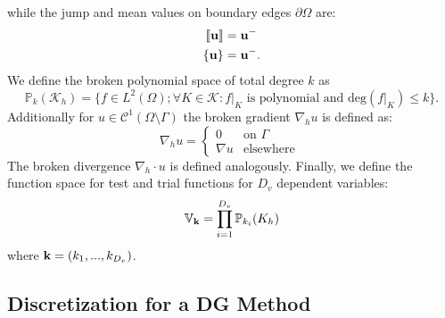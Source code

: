 while the jump and mean values on boundary edges $\partial \Omega$ are:
\begin{align}
	\llbracket \textbf{u} \rrbracket & = \textbf{u}^-  \\
	\{\textbf{u}\}                   & = \textbf{u}^-.
\end{align}
We define the broken polynomial space of total degree $k$ as
\begin{equation}
	\mathbb{P}_k(\mathcal{K}_h)= \{f \in L^2\left(\Omega\right); \forall K \in \mathcal{K}: f\vert_{K} \text{ is polynomial and deg}\left(f\vert_{K}\right)\leq k \}.
	\label{Eq:PolSpace}
\end{equation}
Additionally for $u \in \mathcal{C}^1(\Omega \setminus \Gamma)$ the broken gradient $\nabla_h u$ is defined as:
\begin{equation}
	\nabla_h u
	= \begin{cases}
		0
		 & \text{on }\Gamma  \\
		\nabla u
		 & \text{elsewhere }
	\end{cases}
\end{equation}
The broken divergence  $\nabla_h \cdot u$ is defined analogously. Finally, we define the function space for test and trial functions for $D_v$ dependent variables:
\begin{equation}
	\mathbb{V}_{\textbf{k}} = \prod_{i=1}^{D_v} \mathbb{P}_{k_i}(K_h)
	\label{Eq:Vspace}
\end{equation}
where $\textbf{k} = \left(k_1,...,k_{D_v}\right)$.



\subsection{Discretization for a DG Method}
\label{sec:discretDGmethod}

